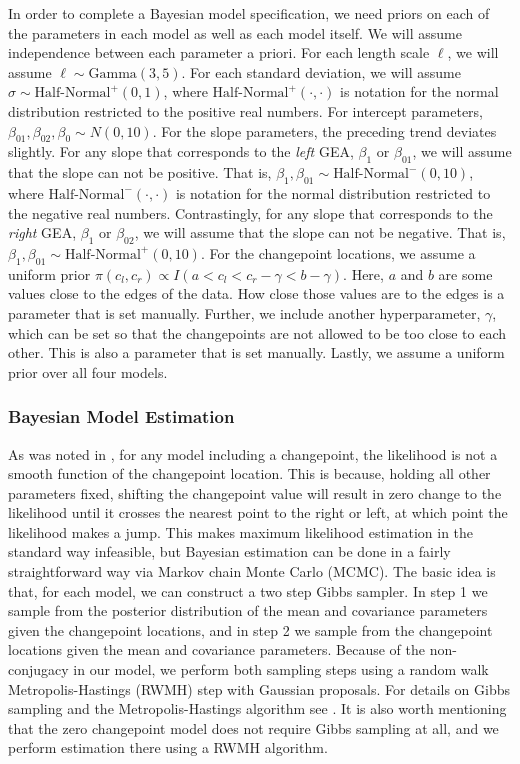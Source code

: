\documentclass[12pt]{article}
\begin{document}
In order to complete a Bayesian model specification, we need priors on
each of the parameters in each model as well as each model itself. We
will assume independence between each parameter a priori. For each
length scale \(\ell\), we will assume \(\ell \sim \text{Gamma}(3,5)\).
For each standard deviation, we will assume
\(\sigma \sim \text{Half-Normal}^{+}(0,1)\), where
\(\text{Half-Normal}^{+}(\cdot,\cdot)\) is notation for the normal
distribution restricted to the positive real numbers. For intercept
parameters, \(\beta_{01}, \beta_{02}, \beta_0 \sim N(0, 10)\). For the
slope parameters, the preceding trend deviates slightly. For any slope
that corresponds to the \emph{left} GEA, \(\beta_1\) or \(\beta_{01}\),
we will assume that the slope can not be positive. That is,
\(\beta_1, \beta_{01} \sim \text{Half-Normal}^{-}(0,10)\), where
\(\text{Half-Normal}^{-}(\cdot, \cdot)\) is notation for the normal
distribution restricted to the negative real numbers. Contrastingly, for
any slope that corresponds to the \emph{right} GEA, \(\beta_1\) or
\(\beta_{02}\), we will assume that the slope can not be negative. That
is, \(\beta_1, \beta_{01} \sim \text{Half-Normal}^{+}(0,10)\). For the
changepoint locations, we assume a uniform prior
\(\pi(c_l, c_r) \propto I(a < c_l < c_r - \gamma < b - \gamma)\). Here,
\(a\) and \(b\) are some values close to the edges of the data. How
close those values are to the edges is a parameter that is set manually.
Further, we include another hyperparameter, \(\gamma\), which can be set
so that the changepoints are not allowed to be too close to each other.
This is also a parameter that is set manually. Lastly, we assume a
uniform prior over all four models.

\subsubsection{Bayesian Model Estimation}

As was noted in \citet{stephens1994}, for any model including a
changepoint, the likelihood is not a smooth function of the changepoint
location. This is because, holding all other parameters fixed, shifting
the changepoint value will result in zero change to the likelihood until
it crosses the nearest point to the right or left, at which point the
likelihood makes a jump. This makes maximum likelihood estimation in the
standard way infeasible, but Bayesian estimation can be done in a fairly
straightforward way via Markov chain Monte Carlo (MCMC). The basic idea
is that, for each model, we can construct a two step Gibbs sampler. In
step 1 we sample from the posterior distribution of the mean and
covariance parameters given the changepoint locations, and in step 2 we
sample from the changepoint locations given the mean and covariance
parameters. Because of the non-conjugacy in our model, we perform both
sampling steps using a random walk Metropolis-Hastings (RWMH) step with
Gaussian proposals. For details on Gibbs sampling and the
Metropolis-Hastings algorithm see \citet{gelman2013}. It is also worth
mentioning that the zero changepoint model does not require Gibbs
sampling at all, and we perform estimation there using a RWMH algorithm.
\end{document}
